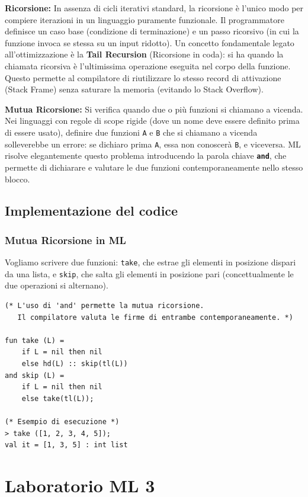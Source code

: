 \documentclass[12pt, a4paper]{article}
\begin{document}
\newpage

\textbf{Ricorsione:}
In assenza di cicli iterativi standard, la ricorsione è l'unico modo per compiere iterazioni in un linguaggio puramente funzionale. Il programmatore definisce un caso base (condizione di terminazione) e un passo ricorsivo (in cui la funzione invoca se stessa su un input ridotto).
Un concetto fondamentale legato all'ottimizzazione è la \textbf{Tail Recursion} (Ricorsione in coda): si ha quando la chiamata ricorsiva è l'ultimissima operazione eseguita nel corpo della funzione. Questo permette al compilatore di riutilizzare lo stesso record di attivazione (Stack Frame) senza saturare la memoria (evitando lo Stack Overflow).

\textbf{Mutua Ricorsione:}
Si verifica quando due o più funzioni si chiamano a vicenda. Nei linguaggi con regole di scope rigide (dove un nome deve essere definito prima di essere usato), definire due funzioni \texttt{A} e \texttt{B} che si chiamano a vicenda solleverebbe un errore: se dichiaro prima \texttt{A}, essa non conoscerà \texttt{B}, e viceversa.
ML risolve elegantemente questo problema introducendo la parola chiave \textbf{\texttt{and}}, che permette di dichiarare e valutare le due funzioni contemporaneamente nello stesso blocco.

\subsection{Implementazione del codice}

\subsubsection{Mutua Ricorsione in ML}
Vogliamo scrivere due funzioni: \texttt{take}, che estrae gli elementi in posizione dispari da una lista, e \texttt{skip}, che salta gli elementi in posizione pari (concettualmente le due operazioni si alternano).
\begin{verbatim}
(* L'uso di 'and' permette la mutua ricorsione. 
   Il compilatore valuta le firme di entrambe contemporaneamente. *)

fun take (L) =
    if L = nil then nil
    else hd(L) :: skip(tl(L))
and skip (L) =
    if L = nil then nil
    else take(tl(L));

(* Esempio di esecuzione *)
> take ([1, 2, 3, 4, 5]);
val it = [1, 3, 5] : int list
\end{verbatim}

\section{Laboratorio ML 3}
\end{document}
